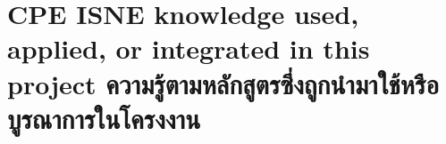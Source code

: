 






\section{\ifenglish%
    \ifcpe CPE \else ISNE \fi knowledge used, applied, or integrated in this project
  \else%
    ความรู้ตามหลักสูตรซึ่งถูกนำมาใช้หรือบูรณาการในโครงงาน
  \fi
 }

